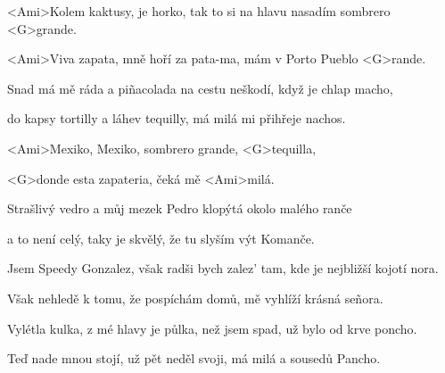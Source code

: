 

\zs
<Ami>Kolem kaktusy, je horko, tak to si na hlavu nasadím sombrero <G>grande.

<Ami>Viva zapata, mně hoří za pata-ma, mám v Porto Pueblo <G>rande.
\ks

\zs
Snad má mě ráda a piñacolada na cestu neškodí, když je chlap macho,

do kapsy tortilly a láhev tequilly, má milá mi přihřeje nachos.
\ks

\zr
<Ami>Mexiko, Mexiko, sombrero grande, <G>tequilla,

<G>donde esta zapateria, čeká mě <Ami>milá.
\kr

\zs
Strašlivý vedro a můj mezek Pedro klopýtá okolo malého ranče

a to není celý, taky je skvělý, že tu slyším výt Komanče.
\ks

\zs
Jsem Speedy Gonzalez, však radši bych zalez' tam, kde je nejbližší kojotí nora.

Však nehledě k tomu, že pospíchám domů, mě vyhlíží krásná señora.
\ks

\zr \kr

\zs
Vylétla kulka, z mé hlavy je půlka, než jsem spad, už bylo od krve poncho.

Teď nade mnou stojí, už pět neděl svoji, má milá a sousedů Pancho.
\ks

\zr \kr

\kp

